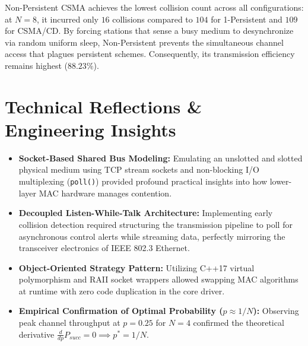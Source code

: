 \documentclass[11pt,a4paper]{article}
\begin{document}
\begin{analysisbox}
Non-Persistent CSMA achieves the lowest collision count across all configurations: at $N=8$, it incurred only $16$ collisions compared to $104$ for 1-Persistent and $109$ for CSMA/CD. By forcing stations that sense a busy medium to desynchronize via random uniform sleep, Non-Persistent prevents the simultaneous channel access that plagues persistent schemes. Consequently, its transmission efficiency remains highest ($88.23\%$).
\end{analysisbox}

\section{Technical Reflections \& Engineering Insights}

\begin{commentbox}
\begin{itemize}[leftmargin=1.2em]
    \item \textbf{Socket-Based Shared Bus Modeling:} Emulating an unslotted and slotted physical medium using TCP stream sockets and non-blocking I/O multiplexing (\texttt{poll()}) provided profound practical insights into how lower-layer MAC hardware manages contention.
    \item \textbf{Decoupled Listen-While-Talk Architecture:} Implementing early collision detection required structuring the transmission pipeline to poll for asynchronous control alerts while streaming data, perfectly mirroring the transceiver electronics of IEEE 802.3 Ethernet.
    \item \textbf{Object-Oriented Strategy Pattern:} Utilizing C++17 virtual polymorphism and RAII socket wrappers allowed swapping MAC algorithms at runtime with zero code duplication in the core driver.
    \item \textbf{Empirical Confirmation of Optimal Probability ($p \approx 1/N$):} Observing peak channel throughput at $p=0.25$ for $N=4$ confirmed the theoretical derivative $\frac{d}{dp} P_{succ} = 0 \implies p^* = 1/N$.
\end{itemize}
\end{commentbox}
\end{document}

